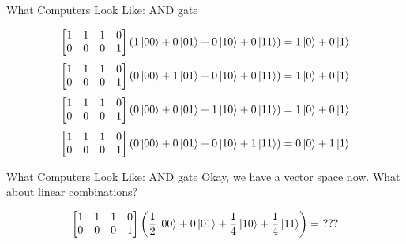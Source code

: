 \documentclass{beamer}
\begin{document}
\begin{frame}{What Computers Look Like: AND gate}
    
    $$ \begin{bmatrix}
        1 & 1 & 1 & 0 \\
        0 & 0 & 0 & 1
    \end{bmatrix}\left(1\ket{00}+0\ket{01}+0\ket{10}+0\ket{11}\right) = 1\ket{0}+0\ket{1}$$
    $$ \begin{bmatrix}
        1 & 1 & 1 & 0 \\
        0 & 0 & 0 & 1
    \end{bmatrix}\left(0\ket{00}+1\ket{01}+0\ket{10}+0\ket{11}\right) = 1\ket{0}+0\ket{1}$$
    $$ \begin{bmatrix}
        1 & 1 & 1 & 0 \\
        0 & 0 & 0 & 1
    \end{bmatrix}\left(0\ket{00}+0\ket{01}+1\ket{10}+0\ket{11}\right) = 1\ket{0}+0\ket{1}$$
    $$ \begin{bmatrix}
        1 & 1 & 1 & 0 \\
        0 & 0 & 0 & 1
    \end{bmatrix}\left(0\ket{00}+0\ket{01}+0\ket{10}+1\ket{11}\right) = 0\ket{0}+1\ket{1}$$
\end{frame}
\begin{frame}{What Computers Look Like: AND gate}
    Okay, we have a vector space now. What about linear combinations?
    
    $$\begin{bmatrix}
        1 & 1 & 1 & 0 \\
        0 & 0 & 0 & 1
    \end{bmatrix}\left(\frac{1}{2}\ket{00}+0\ket{01}+\frac{1}{4}\ket{10}+\frac{1}{4}\ket{11}\right) = \ ???$$
    
\end{frame}
\end{document}
